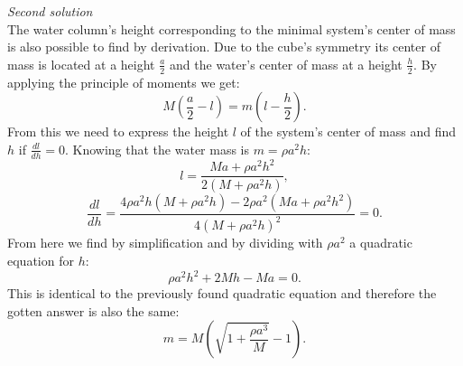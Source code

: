 \emph{Second solution}\\
The water column’s height corresponding to the minimal system’s center of mass is also possible to find by derivation. Due to the cube’s symmetry its center of mass is located at a height $\frac{a}{2}$ and the water’s center of mass at a height $\frac{h}{2}$. By applying the principle of moments we get:
$$M(\frac{a}{2}-l)=m(l-\frac{h}{2}).$$
From this we need to express the height $l$ of the system’s center of mass and find $h$ if $\frac{dl}{dh}=0$. Knowing that the water mass is $m=\rho a^2h$:
$$l=\frac{Ma+\rho a^2h^2}{2(M+\rho a^2h)},$$
$$\frac{dl}{dh}=\frac{4\rho a^2h(M+\rho a^2h)-2\rho a^2(Ma+\rho a^2h^2)}{4(M+\rho a^2h)^2}=0.$$
From here we find by simplification and by dividing with $\rho a^2$ a quadratic equation for $h$:
$$\rho a^2h^2+2Mh-Ma=0.$$
This is identical to the previously found quadratic equation and therefore the gotten answer is also the same:
$$m=M(\sqrt{1+\frac{\rho a^3}{M}}-1).$$
\probend